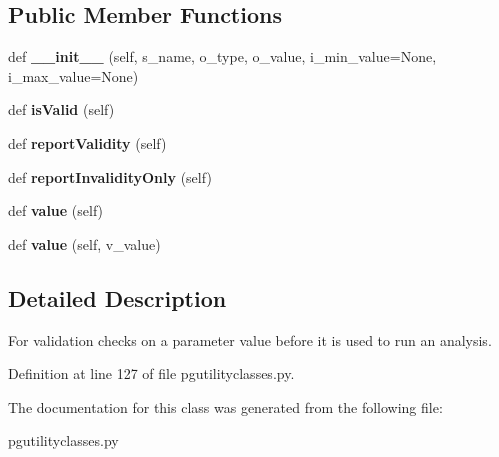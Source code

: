 \subsection*{Public Member Functions}
\begin{DoxyCompactItemize}
\item 
def {\bfseries \+\_\+\+\_\+init\+\_\+\+\_\+} (self, s\+\_\+name, o\+\_\+type, o\+\_\+value, i\+\_\+min\+\_\+value=None, i\+\_\+max\+\_\+value=None)\hypertarget{classnegui_1_1pgutilityclasses_1_1FloatIntStringParamValidity_aca9afc3100b25bfbbe4807d66dfed872}{}\label{classnegui_1_1pgutilityclasses_1_1FloatIntStringParamValidity_aca9afc3100b25bfbbe4807d66dfed872}

\item 
def {\bfseries is\+Valid} (self)\hypertarget{classnegui_1_1pgutilityclasses_1_1FloatIntStringParamValidity_ae4f8588a74ee6757f49a8a6f2bef9a85}{}\label{classnegui_1_1pgutilityclasses_1_1FloatIntStringParamValidity_ae4f8588a74ee6757f49a8a6f2bef9a85}

\item 
def {\bfseries report\+Validity} (self)\hypertarget{classnegui_1_1pgutilityclasses_1_1FloatIntStringParamValidity_a5f14ea6b63e3175ccb728b12520bb142}{}\label{classnegui_1_1pgutilityclasses_1_1FloatIntStringParamValidity_a5f14ea6b63e3175ccb728b12520bb142}

\item 
def {\bfseries report\+Invalidity\+Only} (self)\hypertarget{classnegui_1_1pgutilityclasses_1_1FloatIntStringParamValidity_acae489553a6e2295b527622809843275}{}\label{classnegui_1_1pgutilityclasses_1_1FloatIntStringParamValidity_acae489553a6e2295b527622809843275}

\item 
def {\bfseries value} (self)\hypertarget{classnegui_1_1pgutilityclasses_1_1FloatIntStringParamValidity_a39a4e8fc867e88dc3fb0b8852f01bf24}{}\label{classnegui_1_1pgutilityclasses_1_1FloatIntStringParamValidity_a39a4e8fc867e88dc3fb0b8852f01bf24}

\item 
def {\bfseries value} (self, v\+\_\+value)\hypertarget{classnegui_1_1pgutilityclasses_1_1FloatIntStringParamValidity_a71a6b9ac6c7ed230dfc4c474882f8708}{}\label{classnegui_1_1pgutilityclasses_1_1FloatIntStringParamValidity_a71a6b9ac6c7ed230dfc4c474882f8708}

\end{DoxyCompactItemize}


\subsection{Detailed Description}
\begin{DoxyVerb}For validation checks on a parameter value
before it is used to run an analysis.
\end{DoxyVerb}
 

Definition at line 127 of file pgutilityclasses.\+py.



The documentation for this class was generated from the following file\+:\begin{DoxyCompactItemize}
\item 
pgutilityclasses.\+py\end{DoxyCompactItemize}
